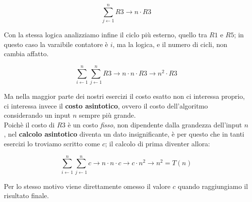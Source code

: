 \documentclass{article}
\begin{document}
\[ \sum_{j \leftarrow 1}^{n} R3 \rightarrow n \cdot R3 \]

Con la stessa logica analizziamo infine il ciclo più esterno, quello tra 
$R1$ e $R5$; in questo caso la varaibile contatore è $i$, ma la logica, e il 
numero di cicli, non cambia affatto.

\[ 
\sum_{i \leftarrow 1}^{n} \sum_{j \leftarrow 1}^{n} R3 
\rightarrow n \cdot n \cdot R3 \rightarrow
n^2 \cdot R3
\]

Ma nella maggior parte dei nostri esercizi il costo esatto non ci 
interessa proprio, ci interessa invece il \textbf{costo asintotico}, ovvero
il costo dell'algoritmo considerando un input $n$ sempre più grande. \\
Poichè il costo di $R3$ è un costo \textit{fisso}, non dipendente dalla grandezza
dell'input $n$, nel \textbf{calcolo asintotico} diventa un dato insignificante,
è per questo che in tanti esercizi lo troviamo scritto come $c$; il calcolo 
di prima diventer allora:

\[ 
\sum_{i \leftarrow 1}^{n} \sum_{j \leftarrow 1}^{n} c 
\rightarrow n \cdot n \cdot c \rightarrow
c \cdot n^2 \rightarrow n^2 = T(n)
\]

Per lo stesso motivo viene direttamente omesso il valore $c$ quando 
raggiungiamo il risultato finale.
\end{document}

